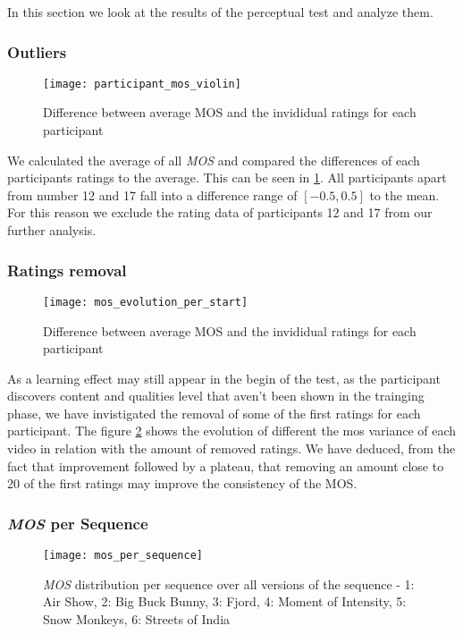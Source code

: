 In this section we look at the results of the perceptual test and analyze them.

\subsubsection{Outliers}
\begin{figure}[htb!]
	\centering
	\texttt{[image: participant\_mos\_violin]}
	\caption{Difference between average MOS and the invididual ratings for each participant}
	\label{fig:result:participant_violin}
\end{figure}

We calculated the average of all \textit{MOS} and compared the differences of each participants ratings to the average. This can be seen in \ref{fig:result:participant_violin}. All participants apart from number 12 and 17 fall into a difference range of $[-0.5, 0.5]$ to the mean. For this reason we exclude the rating data of participants 12 and 17 from our further analysis.



\subsubsection{Ratings removal}
\begin{figure}[htb!]
	\centering
	\texttt{[image: mos\_evolution\_per\_start]}
	\caption{Difference between average MOS and the invididual ratings for each participant}
	\label{fig:result:mos_evolution_per_start}
\end{figure}

As a learning effect may still appear in the begin of the test, as the participant discovers content and qualities level that aven't been shown in the trainging phase, we have invistigated the removal of some of the first ratings for each participant. The figure \ref{fig:result:mos_evolution_per_start} shows the evolution of different the mos variance of each video in relation with the amount of removed ratings.
We have deduced, from the fact that improvement followed by a plateau, that removing an amount close to 20 of the first ratings may improve the consistency of the MOS.



\subsubsection{\textit{MOS} per Sequence}
\begin{figure}[htb!]
	\centering
	\texttt{[image: mos\_per\_sequence]}
	\caption{\textit{MOS} distribution per sequence over all versions of the sequence - 1: Air Show, 2: Big Buck Bunny, 3: Fjord, 4: Moment of Intensity, 5: Snow Monkeys, 6: Streets of India}
	\label{fig:result:mos_per_sequence}
\end{figure}

